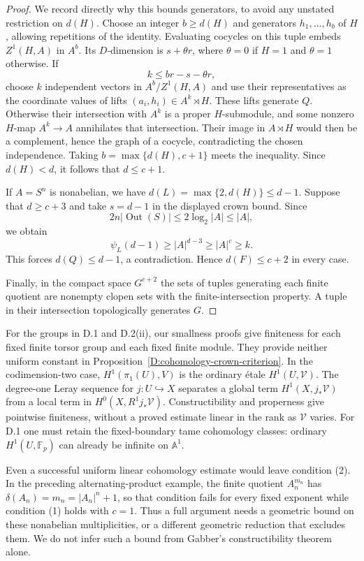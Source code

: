 \begin{proof}
We record directly why this bounds generators, to avoid any
unstated restriction on $d(H)$.  Choose an integer
$b\geq d(H)$ and generators $h_1,\ldots,h_b$ of $H$,
allowing repetitions of the identity.  Evaluating cocycles
on this tuple embeds $Z^1(H,A)$ in $A^b$.  Its $D$-dimension
is $s+\theta r$, where $\theta=0$ if $H=1$ and $\theta=1$
otherwise.  If
\[
 k\leq br-s-\theta r,
\]
choose $k$ independent vectors in $A^b/Z^1(H,A)$ and use
their representatives as the coordinate values of lifts
$(a_i,h_i)\in A^k\rtimes H$.  These lifts generate $Q$.
Otherwise their intersection with $A^k$ is a proper
$H$-submodule, and some nonzero $H$-map $A^k\to A$
annihilates that intersection.  Their image in $A\rtimes H$
would then be a complement, hence the graph of a cocycle,
contradicting the chosen independence.
Taking $b=\max\{d(H),c+1\}$ meets the inequality.
Since $d(H)<d$, it follows that $d\leq c+1$.

If $A=S^n$ is nonabelian, we have
$d(L)=\max\{2,d(H)\}\leq d-1$.
Suppose that $d\geq c+3$ and take $s=d-1$ in the displayed
crown bound.  Since
\[
 2n|\operatorname{Out}(S)|
 \leq2\log_2|A|\leq |A|,
\]
we obtain
\[
 \psi_L(d-1)\geq |A|^{d-3}
      \geq |A|^c\geq k.
\]
This forces $d(Q)\leq d-1$, a contradiction.  Hence
$d(F)\leq c+2$ in every case.

Finally, in the compact space $G^{c+2}$ the sets of tuples
generating each finite quotient are nonempty clopen sets
with the finite-intersection property.  A tuple in their
intersection topologically generates $G$.
\end{proof}

\begin{remark}
For the groups in D.1 and D.2(ii), our smallness proofs give
finiteness for each fixed finite torsor group and each fixed
finite module.  They provide neither uniform constant in
Proposition~\ref{D:cohomology-crown-criterion}.  In the
codimension-two case, $H^1(\pi_1(U),V)$ is the ordinary
\'etale $H^1(U,\mathcal V)$.  The degree-one Leray sequence
for $j:U\hookrightarrow X$ separates a global term
$H^1(X,j_*\mathcal V)$ from a local term in
$H^0(X,R^1j_*\mathcal V)$.  Constructibility and properness
give pointwise finiteness, without a proved estimate linear
in the rank as $\mathcal V$ varies.  For D.1 one must retain
the fixed-boundary tame cohomology classes: ordinary
$H^1(U,\mathbb F_p)$ can already be infinite on $\mathbb A^1$.

Even a successful uniform linear cohomology estimate would
leave condition (2).  In the preceding alternating-product
example, the finite quotient $A_n^{m_n}$ has
$\delta(A_n)=m_n=|A_n|^n+1$, so that condition fails for
every fixed exponent while condition (1) holds with $c=1$.
Thus a full argument needs a geometric bound on these
nonabelian multiplicities, or a different geometric reduction
that excludes them.  We do not infer such a bound from
Gabber's constructibility theorem alone.
\end{remark}
